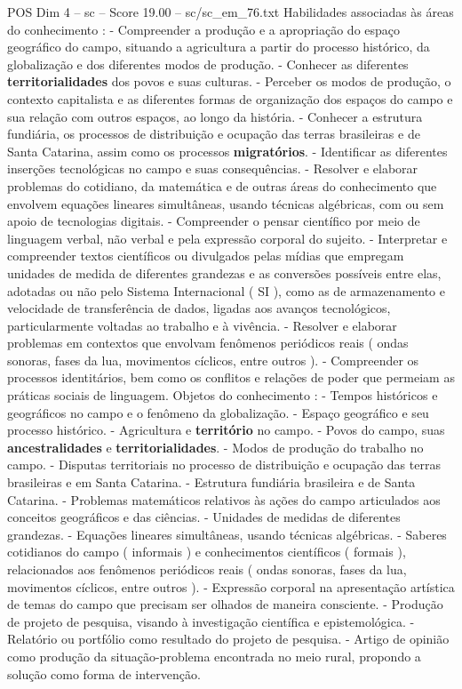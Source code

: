 \begin{textsample}{POS Dim 4 – sc – Score 19.00 – sc/sc\_em\_76.txt}
Habilidades associadas às áreas do conhecimento : - Compreender a produção e a apropriação do espaço geográfico do campo, situando a agricultura a partir do processo histórico, da globalização e dos diferentes modos de produção. - Conhecer as diferentes \textbf{territorialidades} dos povos e suas culturas. - Perceber os modos de produção, o contexto capitalista e as diferentes formas de organização dos espaços do campo e sua relação com outros espaços, ao longo da história. - Conhecer a estrutura fundiária, os processos de distribuição e ocupação das terras brasileiras e de Santa Catarina, assim como os processos \textbf{migratórios}. - Identificar as diferentes inserções tecnológicas no campo e suas consequências. - Resolver e elaborar problemas do cotidiano, da matemática e de outras áreas do conhecimento que envolvem equações lineares simultâneas, usando técnicas algébricas, com ou sem apoio de tecnologias digitais. - Compreender o pensar científico por meio de linguagem verbal, não verbal e pela expressão corporal do sujeito. - Interpretar e compreender textos científicos ou divulgados pelas mídias que empregam unidades de medida de diferentes grandezas e as conversões possíveis entre elas, adotadas ou não pelo Sistema Internacional ( SI ), como as de armazenamento e velocidade de transferência de dados, ligadas aos avanços tecnológicos, particularmente voltadas ao trabalho e à vivência. - Resolver e elaborar problemas em contextos que envolvam fenômenos periódicos reais ( ondas sonoras, fases da lua, movimentos cíclicos, entre outros ). - Compreender os processos identitários, bem como os conflitos e relações de poder que permeiam as práticas sociais de linguagem.
Objetos do conhecimento : - Tempos históricos e geográficos no campo e o fenômeno da globalização. - Espaço geográfico e seu processo histórico. - Agricultura e \textbf{território} no campo. - Povos do campo, suas \textbf{ancestralidades} e \textbf{territorialidades}. - Modos de produção do trabalho no campo. - Disputas territoriais no processo de distribuição e ocupação das terras brasileiras e em Santa Catarina. - Estrutura fundiária brasileira e de Santa Catarina. - Problemas matemáticos relativos às ações do campo articulados aos conceitos geográficos e das ciências. - Unidades de medidas de diferentes grandezas. - Equações lineares simultâneas, usando técnicas algébricas. - Saberes cotidianos do campo ( informais ) e conhecimentos científicos ( formais ), relacionados aos fenômenos periódicos reais ( ondas sonoras, fases da lua, movimentos cíclicos, entre outros ). - Expressão corporal na apresentação artística de temas do campo que precisam ser olhados de maneira consciente. - Produção de projeto de pesquisa, visando à investigação científica e epistemológica. - Relatório ou portfólio como resultado do projeto de pesquisa. - Artigo de opinião como produção da situação-problema encontrada no meio rural, propondo a solução como forma de intervenção.

\end{textsample}
